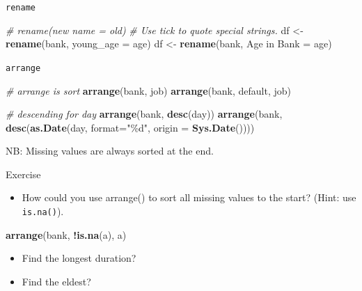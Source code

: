 \documentclass[
  10pt,
  ignorenonframetext,
  serif]{beamer}
\newenvironment{Shaded}{\begin{snugshade}}{\end{snugshade}}
\newcommand{\CommentTok}[1]{\textcolor[rgb]{0.56,0.35,0.01}{\textit{#1}}}
\newcommand{\DataTypeTok}[1]{\textcolor[rgb]{0.13,0.29,0.53}{#1}}
\newcommand{\KeywordTok}[1]{\textcolor[rgb]{0.13,0.29,0.53}{\textbf{#1}}}
\newcommand{\NormalTok}[1]{#1}
\newcommand{\OperatorTok}[1]{\textcolor[rgb]{0.81,0.36,0.00}{\textbf{#1}}}
\newcommand{\StringTok}[1]{\textcolor[rgb]{0.31,0.60,0.02}{#1}}
\providecommand{\tightlist}{%
  \setlength{\itemsep}{0pt}\setlength{\parskip}{0pt}}
\begin{document}
\begin{frame}[fragile]{\texttt{rename}}
\protect\hypertarget{rename}{}
\begin{Shaded}
\begin{Highlighting}[]
\CommentTok{\# rename(new name = old)}
\CommentTok{\# Use tick to quote special strings.}
\NormalTok{df \textless{}{-}}\StringTok{ }\KeywordTok{rename}\NormalTok{(bank, }\DataTypeTok{young\_age =}\NormalTok{ age) }
\NormalTok{df \textless{}{-}}\StringTok{ }\KeywordTok{rename}\NormalTok{(bank, }\StringTok{\textasciigrave{}}\DataTypeTok{Age in Bank}\StringTok{\textasciigrave{}}\NormalTok{ =}\StringTok{ }\NormalTok{age)}
\end{Highlighting}
\end{Shaded}
\end{frame}

\begin{frame}[fragile]{\texttt{arrange}}
\protect\hypertarget{arrange}{}
\begin{Shaded}
\begin{Highlighting}[]
\CommentTok{\# arrange is sort}
\KeywordTok{arrange}\NormalTok{(bank, job)}
\KeywordTok{arrange}\NormalTok{(bank, default, job)}

\CommentTok{\# descending for day}
\KeywordTok{arrange}\NormalTok{(bank, }\KeywordTok{desc}\NormalTok{(day))}
\KeywordTok{arrange}\NormalTok{(bank, }\KeywordTok{desc}\NormalTok{(}\KeywordTok{as.Date}\NormalTok{(day, }\DataTypeTok{format=}\StringTok{"\%d"}\NormalTok{, }\DataTypeTok{origin =} \KeywordTok{Sys.Date}\NormalTok{())))}
\end{Highlighting}
\end{Shaded}

NB: Missing values are always sorted at the end.
\end{frame}

\begin{frame}[fragile]{Exercise}
\protect\hypertarget{exercise-1}{}
\begin{itemize}
\tightlist
\item
  How could you use arrange() to sort all missing values to the start?
  (Hint: use \texttt{is.na()}).
\end{itemize}

\begin{Shaded}
\begin{Highlighting}[]
\KeywordTok{arrange}\NormalTok{(bank, }\OperatorTok{!}\KeywordTok{is.na}\NormalTok{(a), a)}
\end{Highlighting}
\end{Shaded}

\begin{itemize}
\tightlist
\item
  Find the longest duration?
\item
  Find the eldest?
\end{itemize}
\end{frame}
\end{document}
